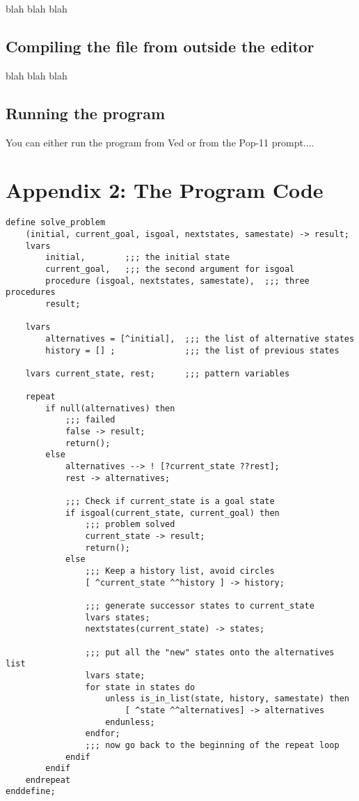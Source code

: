 blah blah blah

\subsection*{Compiling the file from outside the editor}

blah blah blah

\subsection*{Running the program}

You can either run the program from Ved or from the Pop-11 prompt....

\newpage
\section{Appendix 2: The Program Code}

\footnotesize   %

\begin{verbatim}
define solve_problem
    (initial, current_goal, isgoal, nextstates, samestate) -> result;
    lvars
        initial,        ;;; the initial state
        current_goal,   ;;; the second argument for isgoal
        procedure (isgoal, nextstates, samestate),  ;;; three procedures
        result;

    lvars
        alternatives = [^initial],  ;;; the list of alternative states
        history = [] ;              ;;; the list of previous states

    lvars current_state, rest;      ;;; pattern variables

    repeat
        if null(alternatives) then
            ;;; failed
            false -> result;
            return();
        else
            alternatives --> ! [?current_state ??rest];
            rest -> alternatives;

            ;;; Check if current_state is a goal state
            if isgoal(current_state, current_goal) then
                ;;; problem solved
                current_state -> result;
                return();
            else
                ;;; Keep a history list, avoid circles
                [ ^current_state ^^history ] -> history;

                ;;; generate successor states to current_state
                lvars states;
                nextstates(current_state) -> states;

                ;;; put all the "new" states onto the alternatives list
                lvars state;
                for state in states do
                    unless is_in_list(state, history, samestate) then
                        [ ^state ^^alternatives] -> alternatives
                    endunless;
                endfor;
                ;;; now go back to the beginning of the repeat loop
            endif
        endif
    endrepeat
enddefine;
\end{verbatim}

